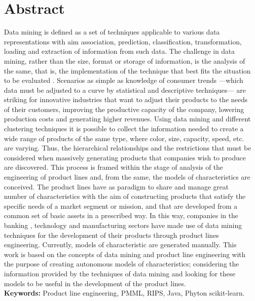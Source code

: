 \chapter{Abstract}

Data mining is defined as a set of techniques applicable to various data representations with aim association, prediction, classification, transformation, loading and extraction of information from such data. The challenge in data mining, rather than the size, format or storage of information, is the analysis of the same, that is, the implementation of the technique that best fits the situation to be evaluated \cite{Izenman2006}. Scenarios as simple as knowledge of consumer trends —which data must be adjusted to a curve by statistical and descriptive techniques— are striking for innovative industries that want to adjust their products to the needs of their customers, improving the productive capacity of the company, lowering production costs and generating higher revenues.
Using data mining and different clustering techniques it is possible to collect the information needed to create a wide range of products of the same type, where color, size, capacity, speed, etc. are varying. Thus, the hierarchical relationships and the restrictions that must be considered when massively generating products that companies wish to produce are discovered. This process is framed within the stage of analysis of the engineering of product lines and, from the same, the models of characteristics are conceived. The product lines have as paradigm to share and manage great number of characteristics with the aim of constructing products that satisfy the specific needs of a market segment or mission, and that are developed from a common set of basic assets in a prescribed way\cite{Nickel2015}. In this way, companies in the banking \cite{Koutanaei2015}, technology \cite{Lin2013} and manufacturing \cite{Bae2011} sectors have made use of data mining techniques for the development of their products through product lines engineering.
Currently, models of characteristic are generated manually. This work is based on the concepts of data mining and product line engineering with the purpose of creating autonomous models of characteristics; considering the information provided by the techniques of data mining and looking for these models to be useful in the development of the product lines.
\\
\textbf{Keywords:}
Product line engineering, PMML, RIPS, Java, Phyton scikit-learn. 